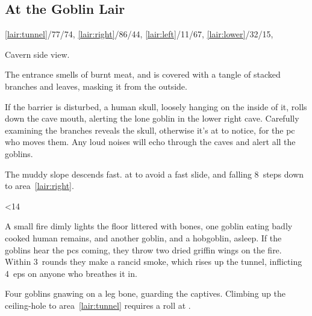 \documentclass[10pt,twoside]{book}
\begin{document}
\subsection{At the Goblin Lair}
%
  {%
    \ref{lair:tunnel}/77/74,
    \ref{lair:right}/86/44,
    \ref{lair:left}/11/67,
    \ref{lair:lower}/32/15,
  }%
{Cavern side view.\par\null}
The entrance smells of burnt meat, and is covered with a tangle of stacked branches and leaves, masking it from the outside.

If the barrier is disturbed, a human skull, loosely hanging on the inside of it, rolls down the cave mouth, alerting the lone goblin in the lower right cave.
Carefully examining the branches reveals the skull, otherwise it's  at \tn[8] to notice, for the \gls{pc} who moves them.
Any loud noises will echo through the caves and alert all the goblins.


The muddy slope descends fast.
 at \tn[8] to avoid a fast slide, and falling 8~\glspl{step} down to \gls{area}~\ref{lair:right}.%

\ifnum\thepage<14
\fi


A small fire dimly lights the floor littered with bones, one goblin eating badly cooked human remains, and another goblin, and a hobgoblin, asleep.
If the goblins hear the \glspl{pc} coming, they throw two dried \gls{griffin} wings on the fire.
Within 3~\glspl{round} they make a rancid smoke, which rises up the tunnel, inflicting 4~\glspl{ep} on anyone who breathes it in.%

Four goblins gnawing on a leg bone, guarding the captives.
Climbing up the ceiling-hole to \gls{area}~\ref{lair:tunnel} requires a  roll at \tn[12].

\end{document}

